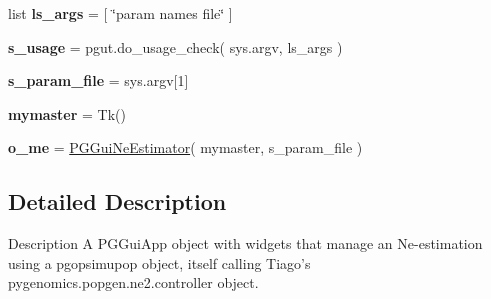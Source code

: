 \begin{DoxyCompactItemize}
\item 
list {\bfseries ls\+\_\+args} = \mbox{[} \char`\"{}param names file\char`\"{} \mbox{]}\hypertarget{namespacenegui_1_1pgguineestimator_a45a6505617cef96ec91ecb82645c5186}{}\label{namespacenegui_1_1pgguineestimator_a45a6505617cef96ec91ecb82645c5186}

\item 
{\bfseries s\+\_\+usage} = pgut.\+do\+\_\+usage\+\_\+check( sys.\+argv, ls\+\_\+args )\hypertarget{namespacenegui_1_1pgguineestimator_ab010b0c2b0e42b82df535ffacaaa848d}{}\label{namespacenegui_1_1pgguineestimator_ab010b0c2b0e42b82df535ffacaaa848d}

\item 
{\bfseries s\+\_\+param\+\_\+file} = sys.\+argv\mbox{[}1\mbox{]}\hypertarget{namespacenegui_1_1pgguineestimator_a1c393929931530813b26431d3ddd51a7}{}\label{namespacenegui_1_1pgguineestimator_a1c393929931530813b26431d3ddd51a7}

\item 
{\bfseries mymaster} = Tk()\hypertarget{namespacenegui_1_1pgguineestimator_a68a5958a55a95800ac7ffbe3f378fa04}{}\label{namespacenegui_1_1pgguineestimator_a68a5958a55a95800ac7ffbe3f378fa04}

\item 
{\bfseries o\+\_\+me} = \hyperlink{classnegui_1_1pgguineestimator_1_1PGGuiNeEstimator}{P\+G\+Gui\+Ne\+Estimator}( mymaster, s\+\_\+param\+\_\+file )\hypertarget{namespacenegui_1_1pgguineestimator_ad89cc54369f6c53fb87d3a9fc7494d88}{}\label{namespacenegui_1_1pgguineestimator_ad89cc54369f6c53fb87d3a9fc7494d88}

\end{DoxyCompactItemize}


\subsection{Detailed Description}
\begin{DoxyVerb}Description
A PGGuiApp object with widgets that manage an Ne-estimation using
a pgopsimupop object, itself calling Tiago's pygenomics.popgen.ne2.controller
object.
\end{DoxyVerb}
 